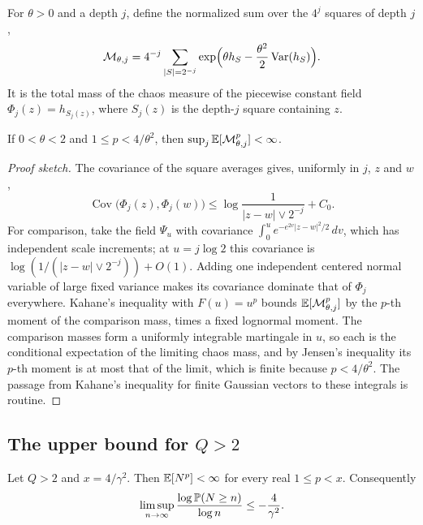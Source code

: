 For $\theta>0$ and a depth $j$, define the normalized sum over the $4^j$ squares of depth $j$,
\[
\mathcal M_{\theta,j}=4^{-j}\sum_{|S|=2^{-j}}\exp\Bigl(\theta h_S-\frac{\theta^2}2\operatorname{Var}(h_S)\Bigr).
\]
It is the total mass of the chaos measure of the piecewise constant field $\Phi_j(z)=h_{S_j(z)}$,
where $S_j(z)$ is the depth-$j$ square containing $z$.

\begin{lemma}\label{lem:moments}
If $0<\theta<2$ and $1\le p<4/\theta^2$, then $\sup_j\mathbb{E}[\mathcal M_{\theta,j}^p]<\infty$.
\end{lemma}

\begin{proof}[Proof sketch]
The covariance of the square averages gives, uniformly in $j$, $z$ and $w$,
\[
\operatorname{Cov}\bigl(\Phi_j(z),\Phi_j(w)\bigr)\le\log\frac1{|z-w|\vee2^{-j}}+C_0 .
\]
For comparison, take the field $\Psi_u$ with covariance $\int_0^ue^{-e^{2v}|z-w|^2/2}\,dv$, which has
independent scale increments; at $u=j\log2$ this covariance is $\log(1/(|z-w|\vee2^{-j}))+O(1)$.
Adding one independent centered normal variable of large fixed variance makes its covariance dominate that of $\Phi_j$ everywhere. Kahane's inequality with
$F(u)=u^p$ bounds $\mathbb{E}[\mathcal M_{\theta,j}^p]$ by the $p$-th moment of the comparison mass, times a
fixed lognormal moment. The comparison masses form a uniformly integrable martingale in $u$, so
each is the conditional expectation of the limiting chaos mass, and by Jensen's inequality its $p$-th
moment is at most that of the limit, which is finite because $p<4/\theta^2$. The passage from
Kahane's inequality for finite Gaussian vectors to these integrals is routine.
\end{proof}

\subsection{The upper bound for \texorpdfstring{$Q>2$}{Q>2}}

\begin{theorem}\label{thm:upper}
Let $Q>2$ and $x=4/\gamma^2$. Then $\mathbb{E}[N^p]<\infty$ for every real $1\le p<x$. Consequently
\[
\limsup_{n\to\infty}\frac{\log\mathbb{P}(N\ge n)}{\log n}\le-\frac4{\gamma^2}.
\]
\end{theorem}


